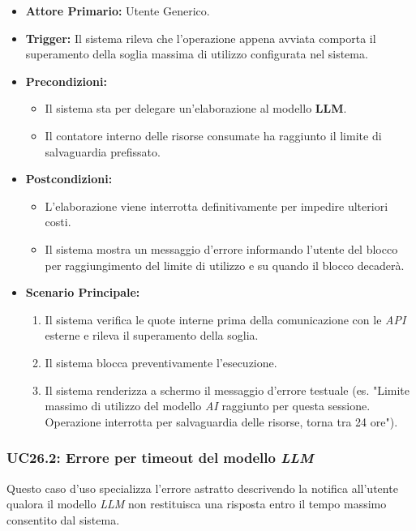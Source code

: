 \documentclass[12pt, a4paper]{article}
\begin{document}
\begin{itemize}
    \item \textbf{Attore Primario:} Utente Generico.
    \item \textbf{Trigger:} Il sistema rileva che l'operazione appena avviata comporta il superamento della soglia massima di utilizzo configurata nel sistema.
    \item \textbf{Precondizioni:}
    \begin{itemize}
        \item Il sistema sta per delegare un'elaborazione al modello \textbf{LLM}.
        \item Il contatore interno delle risorse consumate ha raggiunto il limite di salvaguardia prefissato.
    \end{itemize}
    \item \textbf{Postcondizioni:}
    \begin{itemize}
        \item L'elaborazione viene interrotta definitivamente per impedire ulteriori costi.
        \item Il sistema mostra un messaggio d'errore informando l'utente del blocco per raggiungimento del limite di utilizzo e su quando il blocco decaderà.
    \end{itemize}
    \item \textbf{Scenario Principale:}
    \begin{enumerate}
        \item Il sistema verifica le quote interne prima della comunicazione con le \textit{API} esterne e rileva il superamento della soglia.
        \item Il sistema blocca preventivamente l'esecuzione.
        \item Il sistema renderizza a schermo il messaggio d'errore testuale (es. "Limite massimo di utilizzo del modello \textit{AI} raggiunto per questa sessione. Operazione interrotta per salvaguardia delle risorse, torna tra 24 ore").
    \end{enumerate}
\end{itemize}


\subsubsection{UC26.2: Errore per timeout del modello \textit{LLM}}\label{uc:26.2}
Questo caso d'uso specializza l'errore astratto descrivendo la notifica all'utente qualora il modello \textit{LLM} non restituisca una risposta entro il tempo massimo consentito dal sistema.
\end{document}
